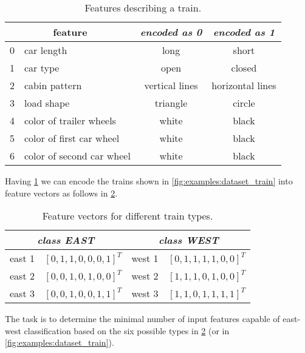 \begin{table}[H]
\centering
\begin{tabular}{|c|l|c|c|}
\hline
\multicolumn{2}{|c|}{feature} & \textit{encoded as \textbf{0}} & \textit{encoded as \textbf{1}} \\ \hline \hline
0 & car length                & long                  & short                 \\ \hline
1 & car type                  & open                  & closed                \\ \hline
2 & cabin pattern             & vertical lines        & horizontal lines      \\ \hline
3 & load shape                & triangle              & circle                \\ \hline
4 & color of trailer wheels   & white                 & black                 \\ \hline
5 & color of first car wheel  & white                 & black                 \\ \hline
6 & color of second car wheel & white                 & black                 \\ \hline
\end{tabular}
\caption{Features describing a train.}
\label{tab:examples:train_features}
\end{table}

Having \cref{tab:examples:train_features} we can encode the trains shown in \cref{fig:examples:dataset_train} into feature vectors as follows in \cref{tab:examples:train_feature_vectors}.

\begin{table}[H]
\centering
\begin{tabular}{|l|c|l|c|}
\hline
\multicolumn{2}{|c|}{\textit{class EAST}} & \multicolumn{2}{c|}{\textit{class WEST}} \\ \hline
east 1    & $ [0, 1, 1, 0, 0, 0, 1]^T $   & west 1   & $ [0, 1, 1, 1, 1, 0, 0]^T $   \\ \hline
east 2    & $ [0, 0, 1, 0, 1, 0, 0]^T $   & west 2   & $ [1, 1, 1, 0, 1, 0, 0]^T $   \\ \hline
east 3    & $ [0, 0, 1, 0, 0, 1, 1]^T $   & west 3   & $ [1, 1, 0, 1, 1, 1, 1]^T $   \\ \hline
\end{tabular}
\caption{Feature vectors for different train types.}
\label{tab:examples:train_feature_vectors}
\end{table}

The task is to determine the minimal number of input features capable of east-west classification based on the six possible types in \cref{tab:examples:train_feature_vectors} (or in \cref{fig:examples:dataset_train}).

